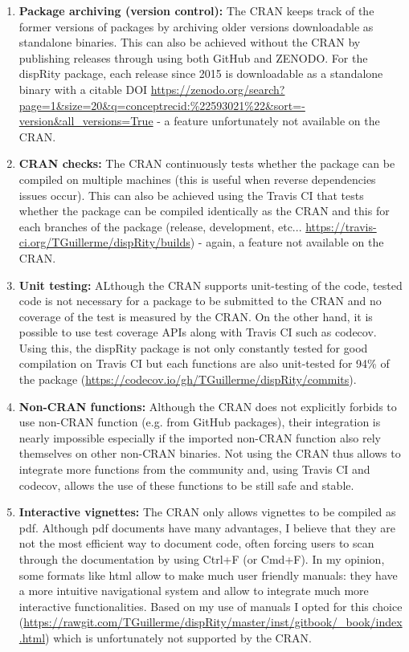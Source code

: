 \documentclass[12pt,letterpaper]{article}
\begin{document}
\begin{enumerate}

\item{\textbf{Package archiving (version control):}}
The CRAN keeps track of the former versions of packages by archiving older versions downloadable as standalone binaries.
This can also be achieved without the CRAN by publishing releases through using both GitHub and ZENODO.
For the dispRity package, each release since 2015 is downloadable as a standalone binary with a citable DOI \url{https://zenodo.org/search?page=1&size=20&q=conceptrecid:%22593021%22&sort=-version&all_versions=True} - a feature unfortunately not available on the CRAN.

\item{\textbf{CRAN checks:}}
The CRAN continuously tests whether the package can be compiled on multiple machines (this is useful when reverse dependencies issues occur).
This can also be achieved using the Travis CI that tests whether the package can be compiled identically as the CRAN and this for each branches of the package (release, development, etc... \url{https://travis-ci.org/TGuillerme/dispRity/builds}) - again, a feature not available on the CRAN.

\item{\textbf{Unit testing:}}
ALthough the CRAN supports unit-testing of the code, tested code is not necessary for a package to be submitted to the CRAN and no coverage of the test is measured by the CRAN.
On the other hand, it is possible to use test coverage APIs along with Travis CI such as codecov. 
Using this, the dispRity package is not only constantly tested for good compilation on Travis CI but each functions are also unit-tested for 94\% of the package (\url{https://codecov.io/gh/TGuillerme/dispRity/commits}).

\item{\textbf{Non-CRAN functions:}}
Although the CRAN does not explicitly forbids to use non-CRAN function (e.g. from GitHub packages), their integration is nearly impossible especially if the imported non-CRAN function also rely themselves on other non-CRAN binaries.
Not using the CRAN thus allows to integrate more functions from the community and, using Travis CI and codecov, allows the use of these functions to be still safe and stable.

\item{\textbf{Interactive vignettes:}}
The CRAN only allows vignettes to be compiled as pdf.
Although pdf documents have many advantages, I believe that they are not the most efficient way to document code, often forcing users to scan through the documentation by using Ctrl+F (or Cmd+F).
In my opinion, some formats like html allow to make much user friendly manuals: they have a more intuitive navigational system and allow to integrate much more interactive functionalities.
Based on my use of manuals I opted for this choice (\url{https://rawgit.com/TGuillerme/dispRity/master/inst/gitbook/_book/index.html}) which is unfortunately not supported by the CRAN.


\end{enumerate}
\end{document}
